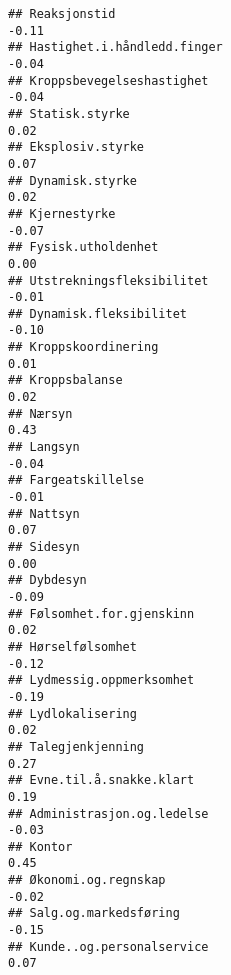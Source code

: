 \documentclass[
]{article}
\begin{document}
\begin{verbatim}
## Reaksjonstid                                                                     -0.11
## Hastighet.i.håndledd.finger                                                      -0.04
## Kroppsbevegelseshastighet                                                        -0.04
## Statisk.styrke                                                                    0.02
## Eksplosiv.styrke                                                                  0.07
## Dynamisk.styrke                                                                   0.02
## Kjernestyrke                                                                     -0.07
## Fysisk.utholdenhet                                                                0.00
## Utstrekningsfleksibilitet                                                        -0.01
## Dynamisk.fleksibilitet                                                           -0.10
## Kroppskoordinering                                                                0.01
## Kroppsbalanse                                                                     0.02
## Nærsyn                                                                            0.43
## Langsyn                                                                          -0.04
## Fargeatskillelse                                                                 -0.01
## Nattsyn                                                                           0.07
## Sidesyn                                                                           0.00
## Dybdesyn                                                                         -0.09
## Følsomhet.for.gjenskinn                                                           0.02
## Hørselfølsomhet                                                                  -0.12
## Lydmessig.oppmerksomhet                                                          -0.19
## Lydlokalisering                                                                   0.02
## Talegjenkjenning                                                                  0.27
## Evne.til.å.snakke.klart                                                           0.19
## Administrasjon.og.ledelse                                                        -0.03
## Kontor                                                                            0.45
## Økonomi.og.regnskap                                                              -0.02
## Salg.og.markedsføring                                                            -0.15
## Kunde..og.personalservice                                                         0.07

\end{verbatim}
\end{document}
